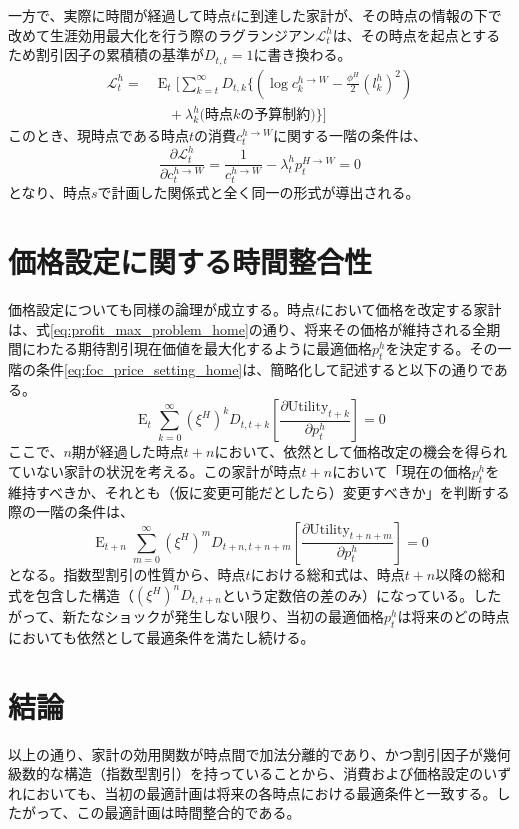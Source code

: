 一方で、実際に時間が経過して時点\(t\)に到達した家計が、その時点の情報の下で改めて生涯効用最大化を行う際のラグランジアン\(\mathcal{L}_t^h\)は、その時点を起点とするため割引因子の累積積の基準が\(D_{t,t}=1\)に書き換わる。
\begin{equation}
\begin{aligned}
\mathcal{L}_t^h=&\operatorname{E}_t\Biggl[\sum_{k=t}^{\infty}D_{t,k}\Biggl\{\left(\log c_k^{h\to W}-\frac{\phi^H}{2}(l_k^h)^2\right) \\
&\quad+\lambda_k^h\biggl(\text{時点}k\text{の予算制約}\biggr)\Biggr\}\Biggr]
\end{aligned}
\label{eq:appendix_time_consistency_sub1_lagrangian_t}
\end{equation}
このとき、現時点である時点\(t\)の消費\(c_t^{h\to W}\)に関する一階の条件は、
\begin{equation}
\frac{\partial\mathcal{L}_t^h}{\partial c_t^{h\to W}}=\frac{1}{c_t^{h\to W}}-\lambda_t^hp_t^{H\to W}=0
\label{eq:appendix_time_consistency_sub1_foc_t}
\end{equation}
となり、時点\(s\)で計画した関係式と全く同一の形式が導出される。

\section{価格設定に関する時間整合性}
\label{sec:appendix_time_consistency_sub2}
価格設定についても同様の論理が成立する。時点\(t\)において価格を改定する家計は、式\eqref{eq:profit_max_problem_home}の通り、将来その価格が維持される全期間にわたる期待割引現在価値を最大化するように最適価格\(p_t^h\)を決定する。その一階の条件\eqref{eq:foc_price_setting_home}は、簡略化して記述すると以下の通りである。
\begin{equation}
\operatorname{E}_t\sum_{k=0}^{\infty}(\xi^H)^kD_{t,t+k}\left[\frac{\partial\text{Utility}_{t+k}}{\partial p_t^h}\right]=0
\label{eq:appendix_time_consistency_sub2_pricing_foc_t}
\end{equation}
ここで、\(n\)期が経過した時点\(t+n\)において、依然として価格改定の機会を得られていない家計の状況を考える。この家計が時点\(t+n\)において「現在の価格\(p_t^h\)を維持すべきか、それとも（仮に変更可能だとしたら）変更すべきか」を判断する際の一階の条件は、
\begin{equation}
\operatorname{E}_{t+n}\sum_{m=0}^{\infty}(\xi^H)^mD_{t+n,t+n+m}\left[\frac{\partial\text{Utility}_{t+n+m}}{\partial p_t^h}\right]=0
\label{eq:appendix_time_consistency_sub2_pricing_foc_tn}
\end{equation}
となる。指数型割引の性質から、時点\(t\)における総和式は、時点\(t+n\)以降の総和式を包含した構造（\((\xi^H)^nD_{t,t+n}\)という定数倍の差のみ）になっている。したがって、新たなショックが発生しない限り、当初の最適価格\(p_t^h\)は将来のどの時点においても依然として最適条件を満たし続ける。

\section{結論}
\label{sec:appendix_time_consistency_conclusion}
以上の通り、家計の効用関数が時点間で加法分離的であり、かつ割引因子が幾何級数的な構造（指数型割引）を持っていることから、消費および価格設定のいずれにおいても、当初の最適計画は将来の各時点における最適条件と一致する。したがって、この最適計画は時間整合的である。